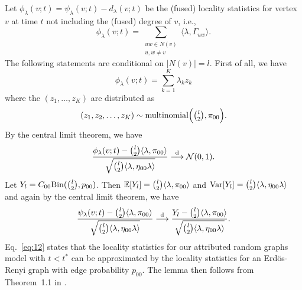 \documentclass[10pt,journal,compsoc]{IEEEtran}
\theoremstyle{definition}
\begin{document}
\begin{IEEEproof}
Let $\phi_{\lambda}(v;t) = \psi_{\lambda}(v;t) - d_{\lambda}(v;t)$ be
the (fused) locality statistics for
vertex $v$ at time $t$ not including the (fused) degree of $v$, i.e.,
\begin{equation}
  \label{eq:11}
  \phi_{\lambda}(v;t) = \sum_{\substack{uw
      \in N(v) \\ u,w \not = v}} \langle \lambda,
  \Gamma_{uw} \rangle.
\end{equation}
The following statements are conditional on $|N(v)| = l$. First
of all, we have
\begin{equation*}
  \phi_{\lambda}(v;t) = \sum_{k=1}^{K}{\lambda_k z_k}
\end{equation*}
where the $(z_1, \dots, z_K)$ are distributed as
\begin{gather*}
  (z_1,z_2,\dots,z_K) \sim \textrm{multinomial}\Bigl(
  \tbinom{l}{2}, \pi_{00}\Bigr). 
\end{gather*}
By the central limit theorem, we have
\begin{equation*}
  \frac{\phi_\lambda(v;t) - \tbinom{l}{2} \langle \lambda, \pi_{00}
    \rangle}{\sqrt{\tbinom{l}{2} \langle \lambda, \eta_{00} \lambda \rangle}}
  \overset{\mathrm{d}}{\longrightarrow} \mathcal{N}(0,1).
\end{equation*}
Let $Y_{l} = C_{00} \mathrm{Bin}(\tbinom{l}{2}, p_{00})$. Then $\mathbb{E}[Y_l] = \tbinom{l}{2} \langle \lambda, \pi_{00} \rangle$
and $\mathrm{Var}[Y_l] = \tbinom{l}{2} \langle \lambda,
\eta_{00} \lambda \rangle$ and again by the central limit theorem, we have
\begin{equation}
  \label{eq:12}
  \frac{\psi_{\lambda}(v;t) - \tbinom{l}{2} \langle \lambda, \pi_{00}
    \rangle}{\sqrt{\tbinom{l}{2} \langle \lambda, \eta_{00} \lambda
      \rangle}}   \overset{\mathrm{d}}{\longrightarrow} \frac{Y_l - \tbinom{l}{2} \langle \lambda, \pi_{00} \rangle}{\sqrt{\tbinom{l}{2}
    \langle \lambda, \eta_{00} \lambda \rangle}}.
\end{equation}
Eq.~\eqref{eq:12} states that the locality statistics for our
attributed random graphs model with $t < t^{*}$
can be approximated by the locality statistics for an Erd\"{o}s-Renyi
graph with edge probability $p_{00}$. The lemma then follows
from Theorem~1.1 in \cite{rukhin:_limit_distr_graph_scan_statis}.
\end{IEEEproof}
\end{document}
